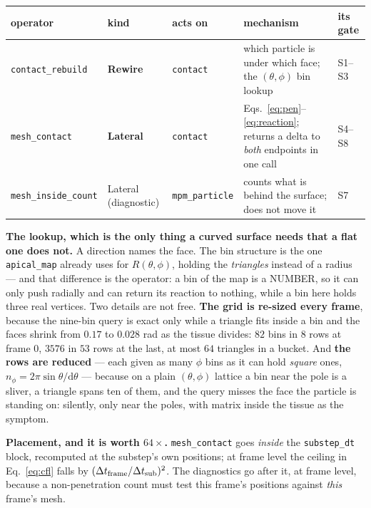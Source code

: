 \documentclass[10pt,a4paper]{article}
\newcommand{\code}[1]{\texttt{#1}}
\newcommand{\op}[1]{\texttt{#1}}
\begin{document}
\begin{center}\footnotesize
\begin{tabular}{@{}lllp{4.4cm}p{3.1cm}@{}}\toprule
\textbf{operator} & \textbf{kind} & \textbf{acts on} & \textbf{mechanism} & \textbf{its gate}\\\midrule
\op{contact\_rebuild} & \textbf{Rewire} & \code{contact} & which particle is under which face; the
  $(\theta,\phi)$ bin lookup & S1--S3\\
\op{mesh\_contact}    & \textbf{Lateral} & \code{contact} & Eqs.~\eqref{eq:pen}--\eqref{eq:reaction};
  returns a delta to \emph{both} endpoints in one call & S4--S8\\
\op{mesh\_inside\_count} & Lateral (diagnostic) & \code{mpm\_particle} & counts what is behind the
  surface; does not move it & S7\\
\bottomrule\end{tabular}
\end{center}

\textbf{The lookup, which is the only thing a curved surface needs that a flat one does not.} A
direction names the face. The bin structure is the one \op{apical\_map} already uses for
$R(\theta,\phi)$, holding the \emph{triangles} instead of a radius --- and that difference is the
operator: a bin of the map is a NUMBER, so it can only push radially and can return its reaction to
nothing, while a bin here holds three real vertices. Two details are not free. \textbf{The grid is
re-sized every frame}, because the nine-bin query is exact only while a triangle fits inside a bin and
the faces shrink from $0.17$ to $0.028$ rad as the tissue divides: $82$ bins in $8$ rows at frame $0$,
$3576$ in $53$ rows at the last, at most $64$ triangles in a bucket. And \textbf{the rows are
reduced} --- each given as many $\phi$ bins as it can hold \emph{square} ones,
$n_\phi=2\pi\sin\theta/\mathrm d\theta$ --- because on a plain $(\theta,\phi)$ lattice a bin near the
pole is a sliver, a triangle spans ten of them, and the query misses the face the particle is standing
on: silently, only near the poles, with matrix inside the tissue as the symptom.

\textbf{Placement, and it is worth $64\times$.} \op{mesh\_contact} goes \emph{inside} the
\code{substep\_dt} block, recomputed at the substep's own positions; at frame level the ceiling in
Eq.~\eqref{eq:cfl} falls by $(\Delta t_{\rm frame}/\Delta t_{\rm sub})^2$. The diagnostics go after it,
at frame level, because a non-penetration count must test this frame's positions against \emph{this}
frame's mesh.
\end{document}
